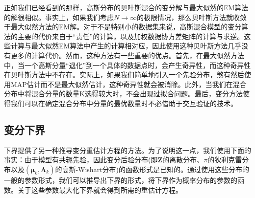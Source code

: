 正如我们已经看到的那样，高斯分布的贝叶斯混合的变分解与最大似然的EM算法的解很相似。事实上，如果我们考虑$N\to \infty$的极限情况，那么贝叶斯方法就收敛于最大似然方法的EM解。对于不是特别小的数据集来说，高斯混合模型的变分算法的主要的代价来自于“责任”的计算，以及加权数据协方差矩阵的计算与求逆。这些计算与最大似然EM算法中产生的计算相对应，因此使用这种贝叶斯方法几乎没有更多的计算代价。然而，这种方法有一些重要的优点。首先，在最大似然方法中，当一个高斯分量“退化”到一个具体的数据点时，会产生奇异性，而这种奇异性在贝叶斯方法中不存在。实际上，如果我们简单地引入一个先验分布，煞有然后使用MAP估计而不是最大似然估计，这种奇异性就会被消除。此外，当我们在混合分布中将混合分量的数量K选得较大时，不会出现过拟合问题。最后，变分方法使得我们可以在确定混合分布中分量的最优数量时不必借助于交互验证的技术。
\subsection*{变分下界}
下界提供了另一种推导变分重估计方程的方法。为了说明这一点，我们使用下面的事实：由于模型有共轭先验，因此变分后验分布(即$\boldsymbol{Z}$的离散分布、$\pi$的狄利克雷分布以及$(\boldsymbol{\mu}_k,\boldsymbol{\Lambda}_k)$的高斯-Wishart分布)的函数形式是已知的。通过使用这些分布的一般的参数形式，我们可以推导出下界的形式，将下界作为概率分布的参数的函数。关于这些参数最大化下界就会得到所需的重估计方程。
